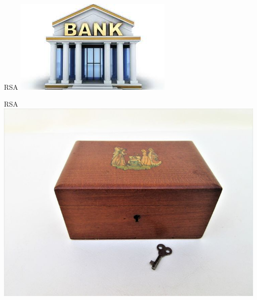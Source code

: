\documentclass{beamer}
\begin{document}
\begin{frame}{RSA}
	\includegraphics[width=\textwidth]{img/bank.jpg}
\end{frame}

\begin{frame}{RSA}
	\includegraphics[width=\textwidth]{img/box.jpg}
\end{frame}
\end{document}
